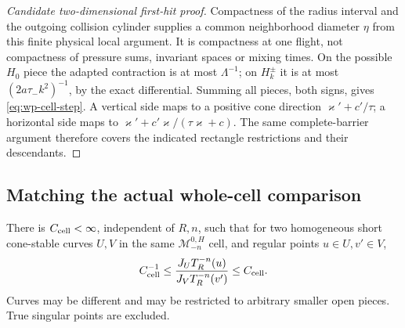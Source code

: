 \begin{proof}[Candidate two-dimensional first-hit proof]
Compactness of the radius interval and the outgoing collision
cylinder supplies a common neighborhood diameter $\eta$ from this
finite physical local argument.  It is compactness at one flight,
not compactness of pressure sums, invariant spaces or mixing times.
On the possible $H_0$ piece the adapted contraction is at most
$\Lambda^{-1}$; on $H_k^\pm$ it is at most
$(2a\tau_- k^2)^{-1}$, by the exact differential.
Summing all pieces, both signs, gives \eqref{eq:wp-cell-step}.
A vertical side maps to a positive cone direction
$\varkappa'+c'/\tau$; a horizontal side maps to
$\varkappa'+c'\varkappa/(\tau\varkappa+c)$.
The same complete-barrier argument therefore covers the indicated
rectangle restrictions and their descendants.
\end{proof}

\subsection{Matching the actual whole-cell comparison}

\begin{lemma}
\label{lem:wp-distortion}
There is $C_{\rm cell}<\infty$, independent of $R,n$, such that
for two homogeneous short cone-stable curves $U,V$ in the same
$\mathcal M_{-n}^{0,H}$ cell, and regular points $u\in U,v'\in V$,
\[
 C_{\rm cell}^{-1}\le
       \frac{J_UT_R^{-n}(u)}{J_VT_R^{-n}(v')}
                       \le C_{\rm cell}.
\]
Curves may be different and may be restricted to arbitrary smaller
open pieces.  True singular points are excluded.
\end{lemma}

